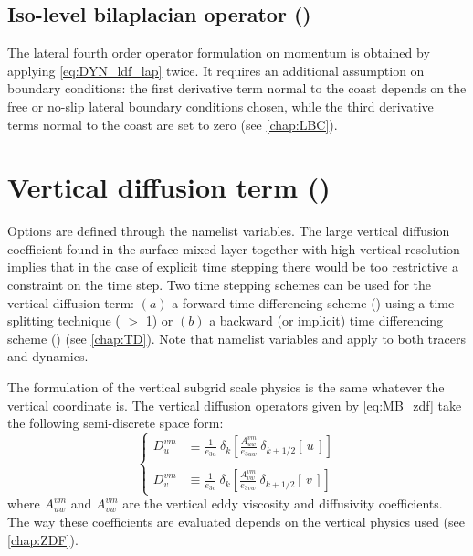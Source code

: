 \documentclass[../main/NEMO_manual]{subfiles}
\begin{document}
\subsection[Iso-level bilaplacian (\forcode{ln_dynldf_bilap})]{Iso-level bilaplacian operator (\protect{})}
\label{subsec:DYN_ldf_bilap}

The lateral fourth order operator formulation on momentum is obtained by applying \autoref{eq:DYN_ldf_lap} twice.
It requires an additional assumption on boundary conditions:
the first derivative term normal to the coast depends on the free or no-slip lateral boundary conditions chosen,
while the third derivative terms normal to the coast are set to zero (see \autoref{chap:LBC}).

\section[Vertical diffusion term (\textit{dynzdf.F90})]{Vertical diffusion term (\protect{})}
\label{sec:DYN_zdf}

Options are defined through the  namelist variables.
The large vertical diffusion coefficient found in the surface mixed layer together with high vertical resolution implies that in the case of explicit time stepping there would be too restrictive a constraint on the time step.
Two time stepping schemes can be used for the vertical diffusion term:
$(a)$ a forward time differencing scheme
() using a time splitting technique ( $>$ 1) or
$(b)$ a backward (or implicit) time differencing scheme ()
(see \autoref{chap:TD}).
Note that namelist variables  and  apply to both tracers and dynamics.

The formulation of the vertical subgrid scale physics is the same whatever the vertical coordinate is.
The vertical diffusion operators given by \autoref{eq:MB_zdf} take the following semi-discrete space form:
\[
  \left\{
    \begin{aligned}
      D_u^{vm} &\equiv \frac{1}{e_{3u}} \ \delta_k \left[ \frac{A_{uw}^{vm} }{e_{3uw} }
        \ \delta_{k+1/2} [\,u\,]         \right]     \\
      \\
      D_v^{vm} &\equiv \frac{1}{e_{3v}} \ \delta_k \left[ \frac{A_{vw}^{vm} }{e_{3vw} }
        \ \delta_{k+1/2} [\,v\,]         \right]
    \end{aligned}
  \right.
\]
where $A_{uw}^{vm} $ and $A_{vw}^{vm} $ are the vertical eddy viscosity and diffusivity coefficients.
The way these coefficients are evaluated depends on the vertical physics used (see \autoref{chap:ZDF}).
\end{document}
